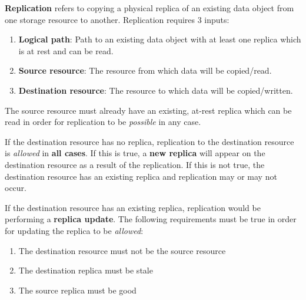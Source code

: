 \documentclass{irodsugm}
\begin{document}
\textbf{Replication} refers to copying a physical replica of an existing data object from one storage resource to another. Replication requires 3 inputs:
\begin{enumerate}
    \item \textbf{Logical path}: Path to an existing data object with at least one replica which is at rest and can be read.
    \item \textbf{Source resource}: The resource from which data will be copied/read.
    \item \textbf{Destination resource}: The resource to which data will be copied/written.
\end{enumerate}

The source resource must already have an existing, at-rest replica which can be read in order for replication to be \textit{possible} in any case.

If the destination resource has no replica, replication to the destination resource is \textit{allowed} in \textbf{all cases}. If this is true, a \textbf{new replica} will appear on the destination resource as a result of the replication. If this is not true, the destination resource has an existing replica and replication may or may not occur.

If the destination resource has an existing replica, replication would be performing a \textbf{replica update}. The following requirements must be true in order for updating the replica to be \textit{allowed}:
\begin{enumerate}
    \item The destination resource must not be the source resource
    \item The destination replica must be stale
    \item The source replica must be good
\end{enumerate}
\end{document}
